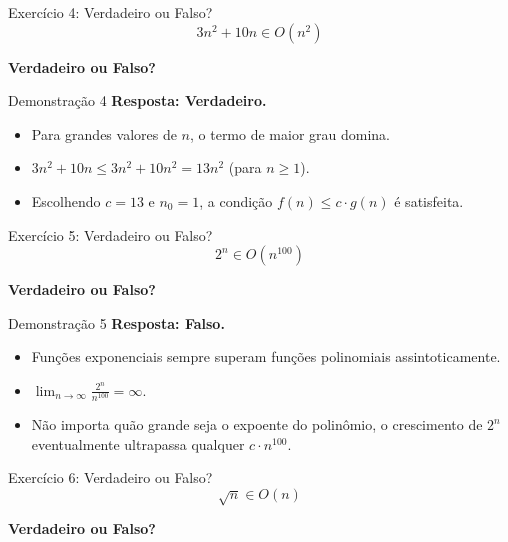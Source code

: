 \documentclass[aspectratio=169]{beamer}
\begin{document}
\begin{frame}{Exercício 4: Verdadeiro ou Falso?}
    \Large
    \[ 3n^2 + 10n \in O(n^2) \]
    \begin{center}
        \textbf{Verdadeiro ou Falso?}
    \end{center}
\end{frame}

\begin{frame}{Demonstração 4}
    \textbf{Resposta: Verdadeiro.}
    \begin{itemize}
        \item Para grandes valores de $n$, o termo de maior grau domina.
        \item $3n^2 + 10n \le 3n^2 + 10n^2 = 13n^2$ (para $n \ge 1$).
        \item Escolhendo $c = 13$ e $n_0 = 1$, a condição $f(n) \le c \cdot g(n)$ é satisfeita.
    \end{itemize}
\end{frame}




\begin{frame}{Exercício 5: Verdadeiro ou Falso?}
    \Large
    \[ 2^n \in O(n^{100}) \]
    \begin{center}
        \textbf{Verdadeiro ou Falso?}
    \end{center}
\end{frame}

\begin{frame}{Demonstração 5}
    \textbf{Resposta: Falso.}
    \begin{itemize}
        \item Funções exponenciais sempre superam funções polinomiais assintoticamente.
        \item $\lim_{n \to \infty} \frac{2^n}{n^{100}} = \infty$.
        \item Não importa quão grande seja o expoente do polinômio, o crescimento de $2^n$ eventualmente ultrapassa qualquer $c \cdot n^{100}$.
    \end{itemize}
\end{frame}


\begin{frame}{Exercício 6: Verdadeiro ou Falso?}
    \Large
    \[ \sqrt{n} \in O(n) \]
    \begin{center}
        \textbf{Verdadeiro ou Falso?}
    \end{center}
\end{frame}
\end{document}

